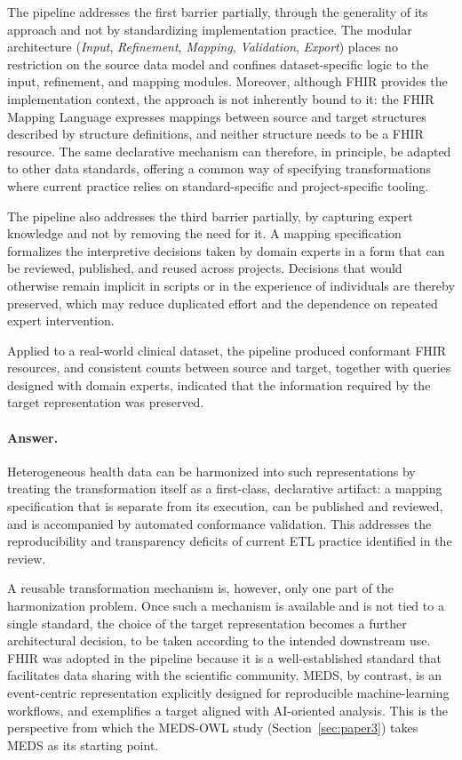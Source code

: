 The pipeline addresses the first barrier partially, through the generality of its approach and not by standardizing implementation practice. The modular architecture (\emph{Input}, \emph{Refinement}, \emph{Mapping}, \emph{Validation}, \emph{Export}) places no restriction on the source data model and confines dataset-specific logic to the input, refinement, and mapping modules. Moreover, although FHIR provides the implementation context, the approach is not inherently bound to it: the FHIR Mapping Language expresses mappings between source and target structures described by structure definitions, and neither structure needs to be a FHIR resource. The same declarative mechanism can therefore, in principle, be adapted to other data standards, offering a common way of specifying transformations where current practice relies on standard-specific and project-specific tooling.

The pipeline also addresses the third barrier partially, by capturing expert knowledge and not by removing the need for it. A mapping specification formalizes the interpretive decisions taken by domain experts in a form that can be reviewed, published, and reused across projects. Decisions that would otherwise remain implicit in scripts or in the experience of individuals are thereby preserved, which may reduce duplicated effort and the dependence on repeated expert intervention.

Applied to a real-world clinical dataset, the pipeline produced conformant FHIR resources, and consistent counts between source and target, together with queries designed with domain experts, indicated that the information required by the target representation was preserved.

\paragraph{Answer.}
Heterogeneous health data can be harmonized into such representations by treating the transformation itself as a first-class, declarative artifact: a mapping specification that is separate from its execution, can be published and reviewed, and is accompanied by automated conformance validation. This addresses the reproducibility and transparency deficits of current ETL practice identified in the review.

A reusable transformation mechanism is, however, only one part of the harmonization problem. Once such a mechanism is available and is not tied to a single standard, the choice of the target representation becomes a further architectural decision, to be taken according to the intended downstream use. FHIR was adopted in the pipeline because it is a well-established standard that facilitates data sharing with the scientific community. MEDS, by contrast, is an event-centric representation explicitly designed for reproducible machine-learning workflows, and exemplifies a target aligned with AI-oriented analysis. This is the perspective from which the MEDS-OWL study (Section~\ref{sec:paper3}) takes MEDS as its starting point.

